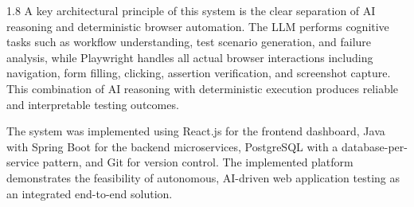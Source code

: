 \begin{spacing}{1.8}
A key architectural principle of this system is the clear separation of AI reasoning and deterministic browser automation. The LLM performs cognitive tasks such as workflow understanding, test scenario generation, and failure analysis, while Playwright handles all actual browser interactions including navigation, form filling, clicking, assertion verification, and screenshot capture. This combination of AI reasoning with deterministic execution produces reliable and interpretable testing outcomes.

The system was implemented using React.js for the frontend dashboard, Java with Spring Boot for the backend microservices, PostgreSQL with a database-per-service pattern, and Git for version control. The implemented platform demonstrates the feasibility of autonomous, AI-driven web application testing as an integrated end-to-end solution.
\end{spacing}
